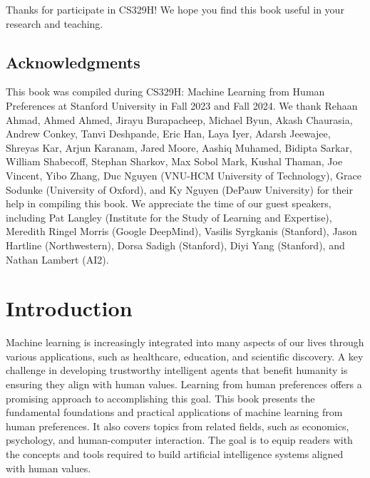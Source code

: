 \documentclass[
  letterpaper,
  DIV=11,
  numbers=noendperiod,
  oneside]{scrreprt}
\let\oldchapter\chapter
\def\chapter{%
  \setcounter{sidenote}{1}%
  \oldchapter
}
\theoremstyle{remark}
\begin{document}

Thanks for participate in CS329H! We hope you find this book useful in
your research and teaching.

\section*{Acknowledgments}\label{acknowledgments}


This book was compiled during CS329H: Machine Learning from Human
Preferences at Stanford University in Fall 2023 and Fall 2024. We thank
Rehaan Ahmad, Ahmed Ahmed, Jirayu Burapacheep, Michael Byun, Akash
Chaurasia, Andrew Conkey, Tanvi Deshpande, Eric Han, Laya Iyer, Adarsh
Jeewajee, Shreyas Kar, Arjun Karanam, Jared Moore, Aashiq Muhamed,
Bidipta Sarkar, William Shabecoff, Stephan Sharkov, Max Sobol Mark,
Kushal Thaman, Joe Vincent, Yibo Zhang, Duc Nguyen (VNU-HCM University
of Technology), Grace Sodunke (University of Oxford), and Ky Nguyen
(DePauw University) for their help in compiling this book. We appreciate
the time of our guest speakers, including Pat Langley (Institute for the
Study of Learning and Expertise), Meredith Ringel Morris (Google
DeepMind), Vasilis Syrgkanis (Stanford), Jason Hartline (Northwestern),
Dorsa Sadigh (Stanford), Diyi Yang (Stanford), and Nathan Lambert (AI2).


\chapter{Introduction}\label{sec-introduction}

Machine learning is increasingly integrated into many aspects of our
lives through various applications, such as healthcare, education, and
scientific discovery. A key challenge in developing trustworthy
intelligent agents that benefit humanity is ensuring they align with
human values. Learning from human preferences offers a promising
approach to accomplishing this goal. This book presents the fundamental
foundations and practical applications of machine learning from human
preferences. It also covers topics from related fields, such as
economics, psychology, and human-computer interaction. The goal is to
equip readers with the concepts and tools required to build artificial
intelligence systems aligned with human values.
\end{document}
